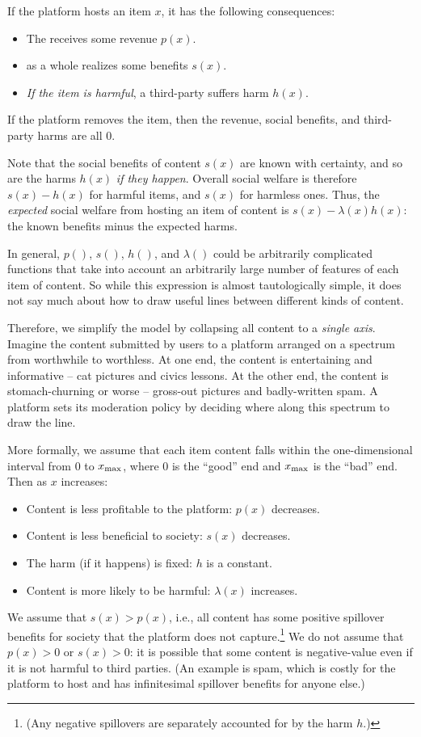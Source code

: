 If the platform hosts an item $x$, it has the following consequences:
\begin{itemize}
\item The  receives some revenue $p(x)$.
\item {} as a whole realizes some benefits $s(x)$.
\item \emph{If the item is harmful}, a third-party  suffers harm $h(x)$.
\end{itemize}
If the platform removes the item, then the revenue, social benefits, and third-party harms are all $0$.

Note that the social benefits of content $s(x)$ are known with certainty, and so are the harms $h(x)$ \emph{if they happen}. Overall social welfare is therefore $s(x) - h(x)$ for harmful items, and $s(x)$ for harmless ones.  Thus, the \emph{expected} social welfare from hosting an item of content is $s(x) - \lambda(x)h(x)$: the known benefits minus the expected harms.

In general, $p()$, $s()$, $h()$, and $\lambda()$ could be arbitrarily complicated functions that take into account an arbitrarily large number of features of each item of content. So while this expression is almost tautologically simple, it does not say much about how to draw useful lines between different kinds of content.

Therefore, we simplify the model by collapsing all content to a \emph{single axis}. Imagine the content submitted by users to a platform arranged on a spectrum from worthwhile to worthless. At one end, the content is entertaining and informative -- cat pictures and civics lessons. At the other end, the content is stomach-churning or worse -- gross-out pictures and badly-written spam. A platform sets its moderation policy by deciding where along this spectrum to draw the line.

More formally, we assume that each item content falls within the one-dimensional interval from $0$ to $x_{\text{max}}$, where $0$ is the ``good'' end and $x_{\text{max}}$ is the ``bad'' end. Then as $x$ increases:
\begin{itemize}
\item Content is less profitable to the platform: $p(x)$ decreases.
\item Content is less beneficial to society: $s(x)$ decreases.
\item The harm (if it happens) is fixed: $h$ is a constant.
\item Content is more likely to be harmful: $\lambda(x)$ increases.
\end{itemize}
We assume that $s(x) > p(x)$, i.e., all content has some positive spillover benefits for society that the platform does not capture.\footnote{(Any negative spillovers are separately accounted for by the harm $h$.)} We do not assume that $p(x) > 0$ or $s(x) > 0$: it is possible that some content is negative-value even if it is not harmful to third parties. (An example is spam, which is costly for the platform to host and has infinitesimal spillover benefits for anyone else.) 

